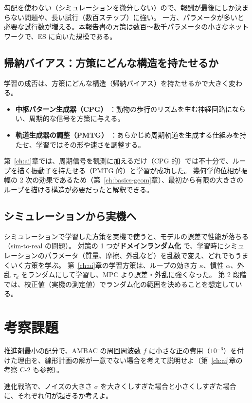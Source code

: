 勾配を使わない（シミュレーションを微分しない）ので、報酬が最後にしか決まらない問題や、長い試行（数百ステップ）に強い。
一方、パラメータが多いと必要な試行数が増える。本報告書の方策は数百〜数千パラメータの小さなネットワークで、ES に向いた規模である。

\subsection{帰納バイアス：方策にどんな構造を持たせるか}

学習の成否は、方策にどんな構造（帰納バイアス）を持たせるかで大きく変わる。
\begin{itemize}
\item \textbf{中枢パターン生成器（CPG）} \cite{R22}：動物の歩行のリズムを生む神経回路にならい、周期的な信号を方策に与える。
\item \textbf{軌道生成器の調整（PMTG）} \cite{R21}：あらかじめ周期軌道を生成する仕組みを持たせ、学習ではその形や速さを調整する。
\end{itemize}
第~\ref{ch:ai}章では、周期信号を観測に加えるだけ（CPG 的）では不十分で、ループを描く振動子を持たせる（PMTG 的）と学習が成功した。
幾何学的位相が振幅の 2 次の効果であるため（第~\ref{ch:basics-geom}章）、最初から有限の大きさのループを描ける構造が必要だったと解釈できる。

\subsection{シミュレーションから実機へ}

シミュレーションで学習した方策を実機で使うと、モデルの誤差で性能が落ちる（sim-to-real の問題）。
対策の 1 つが\textbf{ドメインランダム化} \cite{R23} で、学習時にシミュレーションのパラメータ（質量、摩擦、外乱など）を乱数で変え、どれでもうまくいく方策を学ぶ。
第~\ref{ch:ai}章の学習方策は、ループの効き方 $\kappa$、慣性 $\alpha$、外乱 $\tau_d$ をランダムにして学習し、MPC より誤差・外乱に強くなった。
第 2 段階では、校正値（実機の測定値）でランダム化の範囲を決めることを想定している。

\section*{考察課題}
\begin{exercise}
推進剤最小の配分で、AMBAC の周回周波数 $f$ に小さな正の費用（$10^{-6}$）を付けた理由を、線形計画の解が一意でない場合を考えて説明せよ（第~\ref{ch:ai}章の考察 C-2 も参照）。
\end{exercise}
\begin{exercise}
進化戦略で、ノイズの大きさ $\sigma$ を大きくしすぎた場合と小さくしすぎた場合に、それぞれ何が起きるか考えよ。
\end{exercise}
